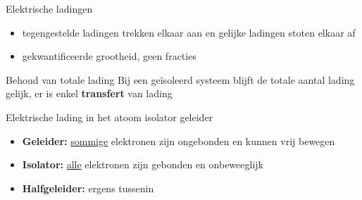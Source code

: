 \begin{theo}{Elektrische ladingen}
    \begin{itemize}
        \item tegengestelde ladingen trekken elkaar aan en gelijke ladingen stoten elkaar af
        \item gekwantificeerde grootheid, geen fracties
    \end{itemize}
\end{theo}

\begin{lem}{Behoud van totale lading}
    Bij een geïsoleerd systeem blijft de totale aantal lading gelijk, er is enkel \textbf{transfert} van lading
\end{lem}

\begin{app}{Elektrische lading in het atoom  isolator geleider}

    \begin{itemize}
        \item \textbf{Geleider:} \underline{sommige} elektronen zijn ongebonden en kunnen vrij bewegen
        \item \textbf{Isolator:} \underline{alle} elektronen zijn gebonden en onbeweeglijk
        \item \textbf{Halfgeleider:} ergens tussenin
    \end{itemize}

\end{app}

